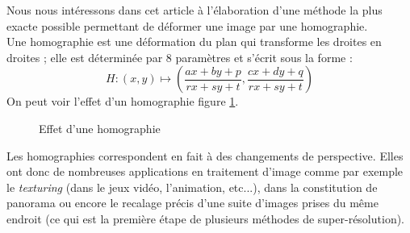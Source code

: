 



	Nous nous intéressons dans cet article à l'élaboration d'une méthode la plus exacte possible permettant de déformer une image par une homographie. \\
 	Une homographie est une déformation du plan qui transforme les droites en droites ; elle est déterminée par 8 paramètres et s'écrit sous la forme :
	\[H : (x,y)\mapsto\left( \frac{ax+by+p}{rx+sy+t},\frac{cx+dy+q}{rx+sy+t}\right)\] 
On peut voir l'effet d'un homographie figure \ref{effethom}.\\

 \begin{figure}
 
   \centering
    \arrowPDP 
   \caption{Effet d'une homographie}
\label{effethom}
 \end{figure}

	Les homographies correspondent en fait à des changements de perspective. Elles ont donc de nombreuses applications en traitement d'image comme par exemple le \emph{texturing} (dans le jeux vidéo, l'animation, etc...), dans la constitution de panorama ou encore le recalage précis d'une suite d'images prises du même endroit (ce qui est la première étape de plusieurs méthodes de super-résolution).


